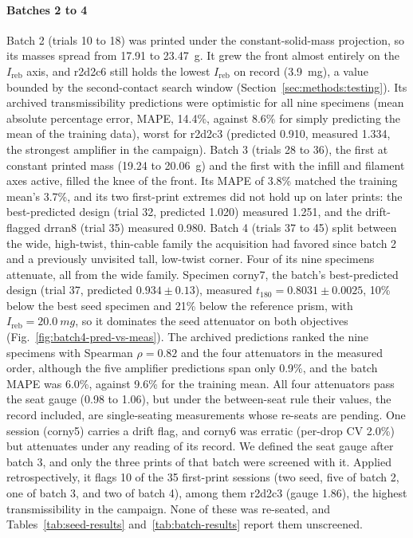 \documentclass[lineno,nocopyright,upint,varvw,hyphenate]{asmejour}
\begin{document}
\paragraph{Batches 2 to 4} Batch 2 (trials 10 to 18) was printed under
the constant-solid-mass projection, so its masses spread from 17.91 to
\SI{23.47}{g}. It grew the front almost entirely on the
$I_{\mathrm{reb}}$ axis, and r2d2c6 still holds the lowest
$I_{\mathrm{reb}}$ on record (\SI{3.9}{mg}), a value bounded by the
second-contact search window (Section~\ref{sec:methods:testing}). Its archived
transmissibility predictions were optimistic for all nine specimens
(mean absolute percentage error, MAPE, 14.4\%, against 8.6\% for simply
predicting the mean of the training data), worst for r2d2c3 (predicted
0.910, measured 1.334, the strongest amplifier in the campaign). Batch 3
(trials 28 to 36), the first at constant printed mass (19.24 to
\SI{20.06}{g}) and the first with the infill and filament axes active,
filled the knee of the front. Its MAPE of 3.8\% matched the training
mean's 3.7\%, and its two first-print extremes did not hold up on later
prints: the best-predicted design (trial 32, predicted 1.020) measured
1.251, and the drift-flagged drran8 (trial 35) measured 0.980. Batch 4
(trials 37 to 45) split between the wide, high-twist, thin-cable family
the acquisition had favored since batch 2 and a previously unvisited
tall, low-twist corner. Four of its nine specimens attenuate, all from
the wide family. Specimen corny7, the batch's best-predicted design
(trial 37, predicted $0.934 \pm 0.13$), measured
$t_{180} = 0.8031 \pm 0.0025$, 10\% below the best seed specimen and
21\% below the reference prism, with $I_{\mathrm{reb}} = \SI{20.0}{mg}$,
so it dominates the seed attenuator on both objectives
(Fig.~\ref{fig:batch4-pred-vs-meas}). The archived predictions ranked
the nine specimens with Spearman $\rho = 0.82$ and the four attenuators
in the measured order, although the five amplifier predictions span only
0.9\%, and the batch MAPE was 6.0\%, against 9.6\% for the training mean. All four attenuators pass the seat
gauge (0.98 to 1.06), but under the between-seat rule their values,
the record included, are single-seating measurements whose re-seats
are pending. One session (corny5) carries a drift flag, and corny6 was
erratic (per-drop CV 2.0\%) but attenuates under any reading of its
record. We defined the seat gauge after batch 3, and only the three
prints of that batch were screened with it. Applied retrospectively, it
flags 10 of the 35 first-print sessions (two seed, five of batch 2, one
of batch 3, and two of batch 4), among them r2d2c3 (gauge 1.86), the
highest transmissibility in the campaign. None of these was re-seated,
and Tables~\ref{tab:seed-results} and~\ref{tab:batch-results} report
them unscreened.
\end{document}
